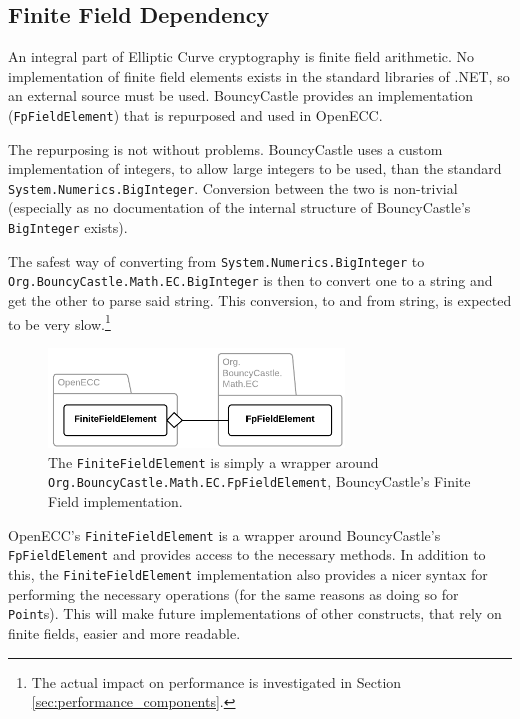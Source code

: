 \subsection{Finite Field Dependency}
\label{sec:implementation__dependencies}
\label{sec:implementation_dependency}

An integral part of Elliptic Curve cryptography is finite field arithmetic. No implementation of finite field elements exists
in the standard libraries of .NET, so an external source must be used. BouncyCastle provides an implementation (\texttt{FpFieldElement})
that is repurposed and used in OpenECC.

The repurposing is not without problems. BouncyCastle uses a custom implementation of integers, to allow large integers to
be used, than the standard \texttt{System.Numerics.BigInteger}. Conversion between the two is non-trivial (especially as no documentation
of the internal structure of BouncyCastle's \texttt{BigInteger} exists).

The safest way of converting from \texttt{System.Numerics.BigInteger} to \texttt{Org.BouncyCastle.Math.EC.BigInteger} is then to
convert one to a string and get the other to parse said string. This conversion, to and from string, is expected to be very slow.\footnote{The
actual impact on performance is investigated in Section \ref{sec:performance_components}.}

\begin{figure}[htb]
	\centering
	\includegraphics[width=0.7\textwidth]{implementation/finitefields}
	\caption{The \texttt{FiniteFieldElement} is simply a wrapper around \texttt{Org.BouncyCastle.Math.EC.FpFieldElement},
		BouncyCastle's Finite Field implementation.}
\end{figure}

OpenECC's \texttt{FiniteFieldElement} is a wrapper around BouncyCastle's \\
\verb+FpFieldElement+ and provides access to the necessary methods.
In addition to this, the \texttt{FiniteFieldElement} implementation also provides a nicer syntax for performing the necessary operations
(for the same reasons as doing so for \texttt{Point}s). This will make future implementations of other constructs, that rely on finite fields,
easier and more readable.